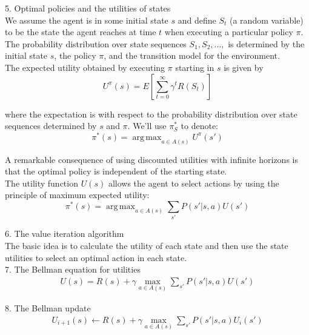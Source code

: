 \documentclass[12pt]{article}
\DeclareMathOperator*{\argmax}{arg\,max}
\begin{document}
5. Optimal policies and the utilities of states \\

We assume the agent is in some initial state $s$ and define $S_t$ (a random variable) to be the state the agent reaches at time $t$ when executing a particular policy $\pi$.  The probability distribution over state sequences $S_1, S_2,...,$ is determined by the initial state $s$, the policy $\pi$, and the transition model for the environment. \\

The expected utility obtained by executing $\pi$ starting in $s$ is given by
\begin{equation*}
U^{\pi}(s) = E \left[ \sum^{\infty}_{t=0} \gamma^t R(S_t) \right]
\end{equation*}

where the expectation is with respect to the probability distribution over state sequences determined by $s$ and $\pi$. We'll use $\pi^*_S$ to denote:
\begin{equation*}
\pi^*(s) = \argmax_{a \in A(s)} U^{\pi}(s')
\end{equation*}

A remarkable consequence of using discounted utilities with infinite horizons is that the optimal policy is independent of the starting state. \\

The utility function $U(s)$ allows the agent to select actions by using the principle of maximum expected utility:
\begin{equation*}
\pi^*(s) = \argmax_{a \in A(s)} \sum_{s'} P(s'|s,a) U(s')
\end{equation*}

6. The value iteration algorithm \\

The basic idea is to calculate the utility of each state and then use the state utilities to select an optimal action in each state. \\

7. The Bellman equation for utilities
\begin{eqnarray*}
U(s) = R(s) + \gamma \max_{a \in A(s)} \sum_{s'} P(s' | s, a) U(s')
\end{eqnarray*}

8. The Bellman update
\begin{eqnarray*}
U_{i+1}(s) \leftarrow
R(s) + \gamma \max_{a \in A(s)} \sum_{s'} P(s' | s, a) U_i(s')
\end{eqnarray*}
\end{document}
